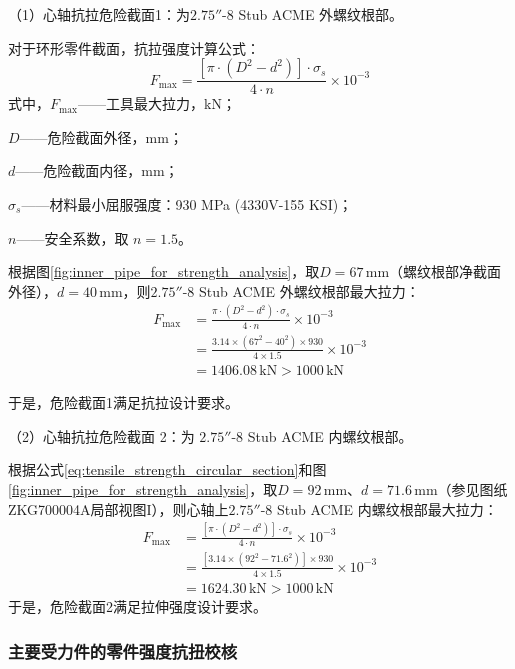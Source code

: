 （1）心轴抗拉危险截面1：为$2.75''\text{-}8$ Stub ACME 外螺纹根部。

对于环形零件截面，抗拉强度计算公式：
\begin{equation}
    F_{\max} = \frac{[\pi \cdot (D^2 - d^2)] \cdot \sigma_s}{4 \cdot n} \times 10^{-3}
    \label{eq:tensile_strength_circular_section}
\end{equation}
式中，$F_{\max}$——工具最大拉力，kN；

$D$——危险截面外径，mm；

$d$——危险截面内径，mm；

$\sigma_s$——材料最小屈服强度：930 MPa (4330V-155 KSI)；

$n$——安全系数，取 $n = 1.5$。

根据图\ref{fig:inner_pipe_for_strength_analysis}，取$D=67\,\textrm{mm}$（螺纹根部净截面外径），$d=40\,\textrm{mm}$，则$2.75''\text{-}8$ Stub ACME 外螺纹根部最大拉力：
\begin{align}
    F_{\max} &= \frac{\pi \cdot (D^2 - d^2) \cdot \sigma_s}{4 \cdot n} \times 10^{-3} \nonumber \\
    &= \frac{3.14 \times (67^2 - 40^2) \times 930}{4 \times 1.5} \times 10^{-3} \nonumber \\
    &= 1406.08 \, \text{kN} > 1000 \, \text{kN}
\end{align}

于是，危险截面1满足抗拉设计要求。

（2）心轴抗拉危险截面 2：为 $2.75''\text{-}8$ Stub ACME 内螺纹根部。

根据公式\ref{eq:tensile_strength_circular_section}和图\ref{fig:inner_pipe_for_strength_analysis}，取$D=92\,\textrm{mm}$、$d=71.6\,\textrm{mm}$（参见图纸ZKG700004A局部视图I），则心轴上$2.75''\text{-}8$ Stub ACME 内螺纹根部最大拉力：
\begin{equation}
\begin{aligned}
    F_{\max} &= \frac{[\pi \cdot (D^2 - d^2) ] \cdot \sigma_s}{4 \cdot n} \times 10^{-3} \nonumber \\
    &= \frac{[3.14 \times (92^2 - 71.6^2) ] \times 930}{4 \times 1.5} \times 10^{-3} \nonumber \\
    &= 1624.30 \, \text{kN} > 1000 \, \text{kN}
\end{aligned}
\end{equation}
于是，危险截面2满足拉伸强度设计要求。


\subsubsection{主要受力件的零件强度抗扭校核}

